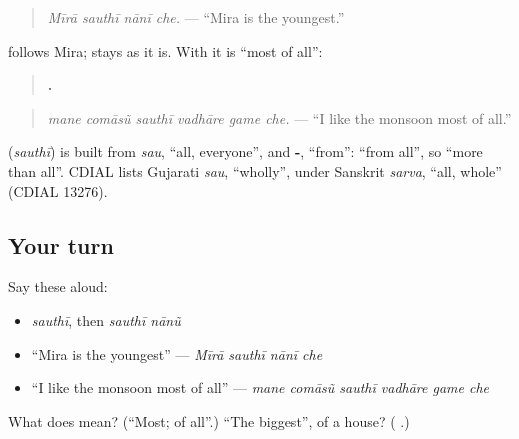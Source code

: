 \begin{quote}
\emph{Mīrā sauthī nānī che.} — \textquotedblleft{}Mira is the youngest.\textquotedblright{}
\end{quote}

\textbf{} follows Mira; \textbf{} stays as it is. With \textbf{} it is \textquotedblleft{}most of all\textquotedblright{}:

\begin{quote}
\textbf{     .}
\end{quote}

\begin{quote}
\emph{mane comāsũ sauthī vadhāre game che.} — \textquotedblleft{}I like the monsoon most of all.\textquotedblright{}
\end{quote}

\begin{cousinweb}
\textbf{} (\emph{sauthī}) is built from \emph{sau}, \textquotedblleft{}all, everyone\textquotedblright{}, and \textbf{-}, \textquotedblleft{}from\textquotedblright{}: \textquotedblleft{}from all\textquotedblright{}, so \textquotedblleft{}more than all\textquotedblright{}. CDIAL lists Gujarati \emph{sau}, \textquotedblleft{}wholly\textquotedblright{}, under Sanskrit \emph{sarva}, \textquotedblleft{}all, whole\textquotedblright{} (CDIAL 13276).
\end{cousinweb}

\subsection*{Your turn}
Say these aloud:

\begin{itemize}
\raggedright
  \item \emph{sauthī}, then \emph{sauthī nānũ}
  \item \textquotedblleft{}Mira is the youngest\textquotedblright{} — \emph{Mīrā sauthī nānī che}
  \item \textquotedblleft{}I like the monsoon most of all\textquotedblright{} — \emph{mane comāsũ sauthī vadhāre game che}
\end{itemize}

\begin{tcolorbox}[breakable,colback=teal!4,colframe=teal!35!black,title={Before you move on}]
What does \textbf{} mean? (\textquotedblleft{}Most; of all\textquotedblright{}.) \textquotedblleft{}The biggest\textquotedblright{}, of a house? (\textbf{ }.)
\end{tcolorbox}
